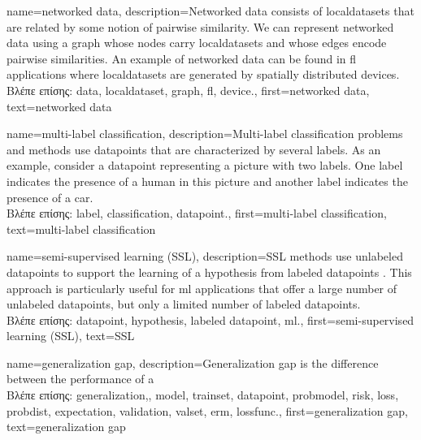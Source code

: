 {name={networked data},
	description={Networked \gls{data} consists of \gls{localdataset}s 
		that are related by some notion of pairwise similarity. We can represent networked 
		\gls{data} using a \gls{graph} whose nodes carry \gls{localdataset}s and whose edges encode 
		pairwise similarities. An example of networked \gls{data} can be found in \gls{fl} applications 
		where \gls{localdataset}s are generated by spatially distributed \gls{device}s.\\
		\foreignlanguage{greek}{Βλέπε επίσης:} \gls{data}, \gls{localdataset}, \gls{graph}, \gls{fl}, \gls{device}.}, 
	first={networked data},
	text={networked data}  
}

{name={multi-label classification}, 
	description={Multi-\gls{label} 
		\gls{classification} problems and methods use \gls{datapoint}s 
		that are characterized by several \gls{label}s. As an example, consider a \gls{datapoint} 
		representing a picture with two \gls{label}s. One \gls{label} indicates the presence of a human 
		in this picture and another \gls{label} indicates the presence of a car.\\
		\foreignlanguage{greek}{Βλέπε επίσης:} \gls{label}, \gls{classification}, \gls{datapoint}.},
	  first={multi-label classification},
	  text={multi-label classification} 
}

{name={semi-supervised learning (SSL)}, 
	description={SSL methods use unlabeled \gls{datapoint}s
		to support the learning of a \gls{hypothesis} from \gls{labeled datapoint}s \cite{SemiSupervisedBook}. 
		This approach is particularly useful for \gls{ml} applications that offer a large number of 
		unlabeled \gls{datapoint}s, but only a limited number of \gls{labeled datapoint}s.\\
		\foreignlanguage{greek}{Βλέπε επίσης:} \gls{datapoint}, \gls{hypothesis}, \gls{labeled datapoint}, \gls{ml}.}, 
	first={semi-supervised learning (SSL)},
	text={SSL} 
}

{name={generalization gap}, 
	description={Generalization gap is the difference between the performance of a 
		\\
		\foreignlanguage{greek}{Βλέπε επίσης:} \gls{generalization},, \gls{model}, \gls{trainset}, \gls{datapoint}, 
		\gls{probmodel}, \gls{risk}, \gls{loss}, \gls{probdist}, \gls{expectation}, \gls{validation}, \gls{valset},  
		\gls{erm}, \gls{lossfunc}.}, 
	first={generalization gap}, 
	text={generalization gap}
} 
	
